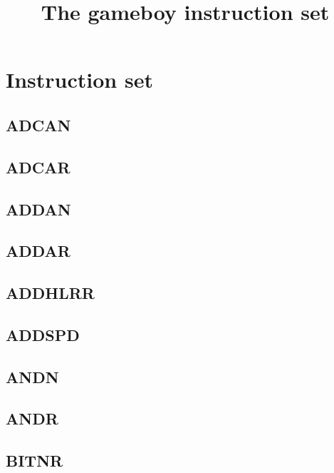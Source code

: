 \documentclass[a4paper]{article}
\begin{document}
\tableofcontents

\title{The gameboy instruction set}

\section{Instruction set}


\subsection{ADCAN}
\sailfclADCANimmdecodeOneSix
\sailfclADCANassembly
\sailfclADCANexecute
\subsection{ADCAR}
\sailfclADCARrdecode
\sailfclADCARassembly
\sailfclADCARexecute
\subsection{ADDAN}
\sailfclADDANimmdecodeOneSix
\sailfclADDANassembly
\sailfclADDANexecute
\subsection{ADDAR}
\sailfclADDARrdecode
\sailfclADDARassembly
\sailfclADDARexecute
\subsection{ADDHLRR}
\sailfclADDHLRRrrdecode
\sailfclADDHLRRassembly
\sailfclADDHLRRexecute
\subsection{ADDSPD}
\sailfclADDSPDddecodeOneSix
\sailfclADDSPDassembly
\sailfclADDSPDexecute
\subsection{ANDN}
\sailfclANDNimmdecodeOneSix
\sailfclANDNassembly
\sailfclANDNexecute
\subsection{ANDR}
\sailfclANDRrdecode
\sailfclANDRassembly
\sailfclANDRexecute
\subsection{BITNR}
\sailfclBITNRdecodeOneSix
\sailfclBITNRassembly
\sailfclBITNRexecute
\end{document}
